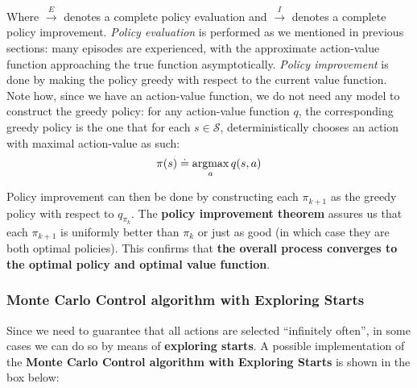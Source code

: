 Where $\overset{E}{\rightarrow}$ denotes a complete policy evaluation and $\overset{I}{\rightarrow}$ denotes a complete policy improvement. \textit{Policy evaluation} is performed as we mentioned in previous sections: many episodes are experienced, with the approximate action-value function approaching the true function asymptotically. \textit{Policy improvement} is done by making the policy greedy with respect to the current value function. Note how, since we have an action-value function, we do not need any model to construct the greedy policy: for any action-value function $q$, the corresponding greedy policy is the one that for each $s \in \mathcal{S}$, deterministically chooses an action with maximal action-value as such:
\begin{equation*}
    \pi(s) \doteq \operatorname*{argmax}_a q(s,a)
\end{equation*}

Policy improvement can then be done by constructing each $\pi_{k+1}$ as the greedy policy with respect to $q_{\pi_k}$. The \textbf{policy improvement theorem} assures us that each $\pi_{k+1}$ is uniformly better than $\pi_k$ or just as good (in which case they are both optimal policies). This confirms that \textbf{the overall process converges to the optimal policy and optimal value function}.

\subsubsection{Monte Carlo Control algorithm with Exploring Starts}
Since we need to guarantee that all actions are selected ``infinitely often'', in some cases we can do so by means of \textbf{exploring starts}. A possible implementation of the \textbf{Monte Carlo Control algorithm with Exploring Starts} is shown in the box below:

